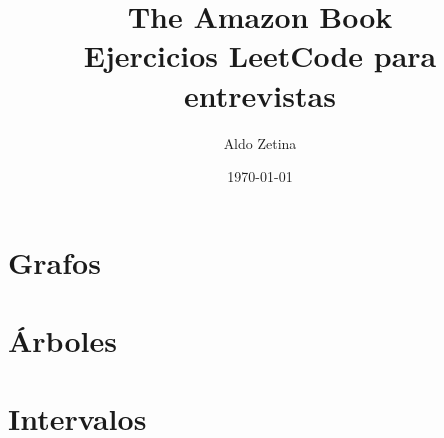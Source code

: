 \documentclass[11pt,oneside]{book}
\title{The Amazon Book\\\large Ejercicios LeetCode para entrevistas}
\author{Aldo Zetina}
\date{\today}
\begin{document}
\maketitle
\tableofcontents



\chapter{Grafos}





















\chapter{Árboles}













\chapter{Intervalos}




\end{document}
